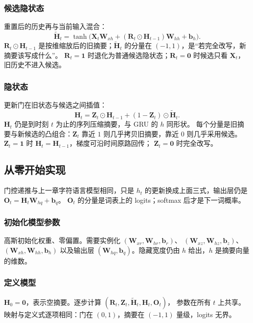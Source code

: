 \subsubsection{候选隐状态}

重置后的历史再与当前输入混合：
\[
\tilde{\bm{H}}_t
=
\tanh\bigl(\bm{X}_t\bm{W}_{xh}+(\bm{R}_t\odot\bm{H}_{t-1})\bm{W}_{hh}+\bm{b}_h\bigr).
\]
$\bm{R}_t\odot\bm{H}_{t-1}$ 是按维缩放后的旧摘要；$\tilde{\bm{H}}_t$ 的分量在 $(-1,1)$，是“若完全改写，新摘要该写成什么”。
$\bm{R}_t=\bm{1}$ 时退化为普通候选隐状态；$\bm{R}_t=\bm{0}$ 时候选只看 $\bm{X}_t$，旧历史不进入候选。

\subsubsection{隐状态}

更新门在旧状态与候选之间插值：
\[
\bm{H}_t
=
\bm{Z}_t\odot\bm{H}_{t-1}+(1-\bm{Z}_t)\odot\tilde{\bm{H}}_t.
\]
$\bm{H}_t$ 仍是到时刻 $t$ 为止的序列压缩摘要，与 GRU 的 $h$ 同形状。
每个分量是旧摘要与新候选的凸组合：$\bm{Z}_t$ 靠近 $1$ 则几乎拷贝旧摘要，靠近 $0$ 则几乎采用候选。
$\bm{Z}_t=\bm{1}$ 时 $\bm{H}_t=\bm{H}_{t-1}$，梯度可沿时间原路回传；
$\bm{Z}_t=\bm{0}$ 时完全改写。

\subsection{从零开始实现}

门控递推与上一章字符语言模型相同，只是 $h_t$ 的更新换成上面三式，输出层仍是
$\bm{O}_t=\bm{H}_t\bm{W}_{hq}+\bm{b}_q$。
$\bm{O}_t$ 的分量是词表上的 logits；softmax 后才是下一词概率。

\subsubsection{初始化模型参数}

高斯初始化权重、零偏置。需要实例化
$(\bm{W}_{xr},\bm{W}_{hr},\bm{b}_r)$、
$(\bm{W}_{xz},\bm{W}_{hz},\bm{b}_z)$、
$(\bm{W}_{xh},\bm{W}_{hh},\bm{b}_h)$
以及输出层 $(\bm{W}_{hq},\bm{b}_q)$。隐藏宽度仍由 $h$ 给出，$h$ 是摘要向量的维数。

\subsubsection{定义模型}

$\bm{H}_0=\bm{0}$，表示空摘要。逐步计算 $(\bm{R}_t,\bm{Z}_t,\tilde{\bm{H}}_t,\bm{H}_t,\bm{O}_t)$，
参数在所有 $t$ 上共享。映射与定义式逐项相同：门在 $(0,1)$，摘要在 $(-1,1)$ 量级，logits 无界。

